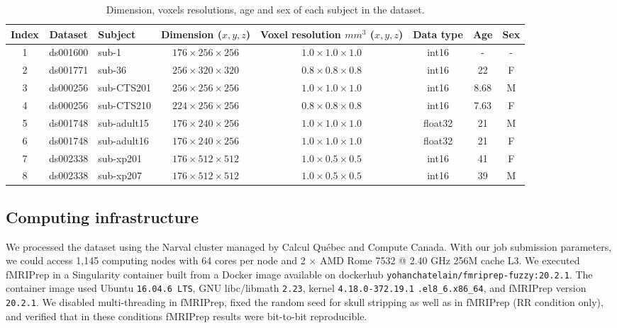 \documentclass{article}
\newcommand{\fmriprep}{fMRIPrep\xspace}
\begin{document}
\begin{table}
    \begin{center}
        \begin{tabular}{c|c|l|c|c|c|c|c}
            Index & Dataset  & Subject     & Dimension ($x,y,z$)         & Voxel resolution $mm^3$ ($x,y,z$) & Data type & Age  & Sex \\
            \hline
            1     & ds001600 & sub-1       & $176 \times 256 \times 256$ & $1.0 \times 1.0 \times 1.0$       & int16     & -    & -   \\
            2     & ds001771 & sub-36      & $256 \times 320 \times 320$ & $0.8 \times 0.8 \times 0.8$       & int16     & 22   & F   \\
            3     & ds000256 & sub-CTS201  & $256 \times 256 \times 256$ & $1.0 \times 1.0 \times 1.0$       & int16     & 8.68 & M   \\
            4     & ds000256 & sub-CTS210  & $224 \times 256 \times 256$ & $0.8 \times 0.8 \times 0.8$       & int16     & 7.63 & F   \\
            5     & ds001748 & sub-adult15 & $176 \times 240 \times 256$ & $1.0 \times 1.0 \times 1.0$       & float32   & 21   & M   \\
            6     & ds001748 & sub-adult16 & $176 \times 240 \times 256$ & $1.0 \times 1.0 \times 1.0$       & float32   & 21   & F   \\
            7     & ds002338 & sub-xp201   & $176 \times 512 \times 512$ & $1.0 \times 0.5 \times 0.5$       & int16     & 41   & F   \\
            8     & ds002338 & sub-xp207   & $176 \times 512 \times 512$ & $1.0 \times 0.5 \times 0.5$       & int16     & 39   & M   \\
        \end{tabular}
    \end{center}
    \caption{Dimension, voxels resolutions, age and sex of each subject in the dataset.}
    \label{table:dataset_info}
\end{table}

\subsection{Computing infrastructure}

We processed the dataset using the Narval cluster managed by Calcul Qu\'ebec and Compute Canada. With our job submission parameters, we could access 1,145 computing nodes with 64 cores per node and 2 $\times$ AMD Rome 7532 @ 2.40 GHz 256M cache L3. We executed \fmriprep in a Singularity container built from a Docker image available on dockerhub \texttt{yohanchatelain/fmriprep-fuzzy:20.2.1}. The container image used Ubuntu \texttt{16.04.6 LTS}, GNU libc/libmath \texttt{2.23}, kernel \texttt{4.18.0-372.19.1} \texttt{.el8\_6.x86\_64}, and fMRIPrep version \texttt{20.2.1}. We disabled multi-threading in fMRIPrep, fixed the random seed for skull stripping as well as in fMRIPrep (RR condition only), and verified that in these conditions fMRIPrep results were bit-to-bit reproducible.
\end{document}
